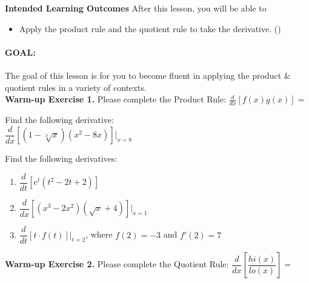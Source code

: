 \documentclass[10pt]{article}
\begin{document}
\pagestyle{otherpages}
\thispagestyle{firstpage}

\textbf{Intended Learning Outcomes}
After this lesson, you will be able to 

\begin{itemize}
    \item Apply the product rule and the quotient rule to take the derivative. ()
\end{itemize}

\vspace{-0.5cm}

\hrulefill

\paragraph*{GOAL:} The goal of this lesson is for you to become fluent in applying the product \& quotient rules in a variety of contexts.\\

{\bf\color{blue}Warm-up Exercise 1.} Please complete the Product Rule: $\displaystyle \frac{d}{dx}[f(x)g(x)]=$   

{} Find the following derivative:\\

$\dfrac{d}{dx}\left[(1-\sqrt[3]{x})(x^2-8x)\right]\bigg|_{x=8}$

\vfill

{} Find the following derivatives:\\

\begin{enumerate}[label=(\alph*)]
\item$\dfrac{d}{dt}[e^t(t^2-2t+2)]$
\vfill

\item $\dfrac{d}{dx}[(x^3-2x^2)(\sqrt{x}+4)]\bigg|_{x=1}$

\vfill
\vfill

\item $\dfrac{d}{dt}\left[ t\cdot f(t) \right]\bigg|_{t=2}$, where $f(2)=-3$ and $f'(2)=7$

\vfill
\vfill

\end{enumerate}

\newpage

{\bf\color{blue}Warm-up Exercise 2.} Please complete the Quotient Rule: $\dfrac{d}{dx}\left[ \dfrac{hi(x)}{lo(x)} \right] =$  \\
\end{document}
